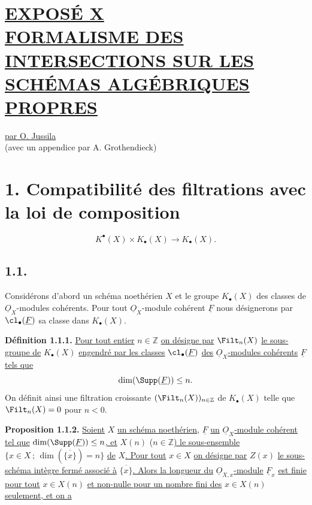 
\section*{\underline{EXPOSÉ X}\\[3pt] \underline{\underline{FORMALISME DES INTERSECTIONS SUR LES SCHÉMAS ALGÉBRIQUES PROPRES}}}
\begin{center}
\underline{par O. Jussila}\\
(avec un appendice par A. Grothendieck)
\end{center}

\section*{1. Compatibilité des filtrations avec la loi de composition}
\[
K^{\bullet}(X)\times K_\bullet(X)\longrightarrow K_\bullet(X).
\]

\subsection*{1.1.}
Considérons d'abord un schéma noethérien $X$ et le groupe $K_\bullet(X)$ des classes de $\underline{O}_X$-modules cohérents. Pour tout $\underline{O}_X$-module cohérent $\underline{F}$ nous désignerons par $\cl_\bullet(\underline{F})$ sa classe dans $K_\bullet(X)$.

\textbf{Définition 1.1.1.} \uline{Pour tout entier} $n\in\mathbb Z$ \uline{on désigne par} $\Filt_n(X)$ \uline{le sous-groupe de} $K_\bullet(X)$ \uline{engendré par les classes} $\cl_\bullet(\underline{F})$ \uline{des} $\underline{O}_X$\uline{-modules cohérents} $\underline{F}$ \uline{tels que}
\[
\dim(\Supp(\underline{F}))\leq n.
\]
On définit ainsi une filtration croissante $(\Filt_n(X))_{n\in\mathbb Z}$ de $K_\bullet(X)$ telle que $\Filt_n(X)=0$ pour $n<0$.

\textbf{Proposition 1.1.2.} \uline{Soient} $X$ \uline{un schéma noethérien,} $\underline{F}$ \uline{un} $\underline{O}_X$\uline{-module cohérent tel que} $\dim(\Supp(\underline{F}))\leq n$\uline{, et} $X(n)$ ($n\in\mathbb Z$\uline{) le sous-ensemble} $\{x\in X\,;\,\dim(\overline{\{x\}})=n\}$ \uline{de} $X$\uline{. Pour tout} $x\in X$ \uline{on désigne par} $Z(x)$ \uline{le sous-schéma intègre fermé associé à} $\overline{\{x\}}$\uline{. Alors la longueur du} $\underline{O}_{X,x}$\uline{-module} $\underline{F}_x$ \uline{est finie pour tout} $x\in X(n)$ \uline{et non-nulle pour un nombre fini des} $x\in X(n)$ \uline{seulement, et on a}
